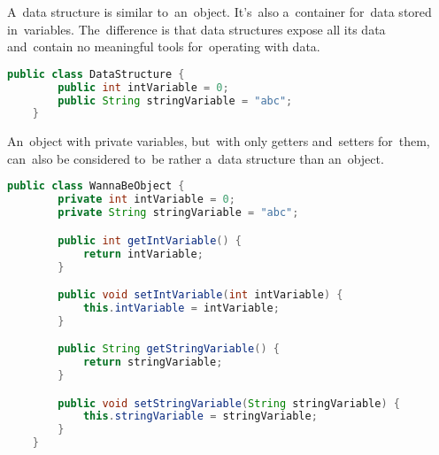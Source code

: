 \label{objectdatastructure}
A~data structure is similar to~an~object.
It's~also a~container for~data stored in~variables.
The~difference is that data structures expose all its data and~contain no meaningful tools for~operating with data.

\begin{lstlisting}[language=Java]
    public class DataStructure {
        public int intVariable = 0;
        public String stringVariable = "abc";
    }
\end{lstlisting}
\newline

\noindent An~object with private variables, but~with only getters and~setters for~them, can~also be considered to~be rather a~data structure than an~object.

\begin{lstlisting}[language=Java]
    public class WannaBeObject {
        private int intVariable = 0;
        private String stringVariable = "abc";

        public int getIntVariable() {
            return intVariable;
        }

        public void setIntVariable(int intVariable) {
            this.intVariable = intVariable;
        }

        public String getStringVariable() {
            return stringVariable;
        }

        public void setStringVariable(String stringVariable) {
            this.stringVariable = stringVariable;
        }
    }
\end{lstlisting}
